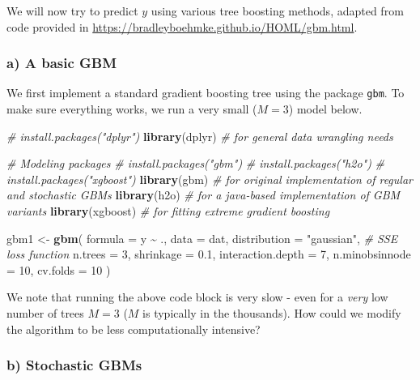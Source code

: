 \documentclass[
]{article}
\newenvironment{Shaded}{\begin{snugshade}}{\end{snugshade}}
\newcommand{\AttributeTok}[1]{\textcolor[rgb]{0.13,0.29,0.53}{#1}}
\newcommand{\CommentTok}[1]{\textcolor[rgb]{0.56,0.35,0.01}{\textit{#1}}}
\newcommand{\DecValTok}[1]{\textcolor[rgb]{0.00,0.00,0.81}{#1}}
\newcommand{\FloatTok}[1]{\textcolor[rgb]{0.00,0.00,0.81}{#1}}
\newcommand{\FunctionTok}[1]{\textcolor[rgb]{0.13,0.29,0.53}{\textbf{#1}}}
\newcommand{\NormalTok}[1]{#1}
\newcommand{\OtherTok}[1]{\textcolor[rgb]{0.56,0.35,0.01}{#1}}
\newcommand{\SpecialCharTok}[1]{\textcolor[rgb]{0.81,0.36,0.00}{\textbf{#1}}}
\newcommand{\StringTok}[1]{\textcolor[rgb]{0.31,0.60,0.02}{#1}}
\begin{document}
We will now try to predict \(y\) using various tree boosting methods,
adapted from code provided in
\url{https://bradleyboehmke.github.io/HOML/gbm.html}.

\subsubsection{a) A basic GBM}\label{a-a-basic-gbm}

We first implement a standard gradient boosting tree using the package
\texttt{gbm}. To make sure everything works, we run a very small
(\(M=3\)) model below.

\begin{Shaded}
\begin{Highlighting}[]
\CommentTok{\# install.packages("dplyr")}
\FunctionTok{library}\NormalTok{(dplyr)    }\CommentTok{\# for general data wrangling needs}

\CommentTok{\# Modeling packages}
\CommentTok{\# install.packages("gbm")}
\CommentTok{\# install.packages("h2o")}
\CommentTok{\# install.packages("xgboost")}
\FunctionTok{library}\NormalTok{(gbm)      }\CommentTok{\# for original implementation of regular and stochastic GBMs}
\FunctionTok{library}\NormalTok{(h2o)      }\CommentTok{\# for a java{-}based implementation of GBM variants}
\FunctionTok{library}\NormalTok{(xgboost)  }\CommentTok{\# for fitting extreme gradient boosting}

\NormalTok{gbm1 }\OtherTok{\textless{}{-}} \FunctionTok{gbm}\NormalTok{(}
  \AttributeTok{formula =}\NormalTok{ y }\SpecialCharTok{\textasciitilde{}}\NormalTok{ .,}
  \AttributeTok{data =}\NormalTok{ dat,}
  \AttributeTok{distribution =} \StringTok{"gaussian"}\NormalTok{,  }\CommentTok{\# SSE loss function}
  \AttributeTok{n.trees =} \DecValTok{3}\NormalTok{,}
  \AttributeTok{shrinkage =} \FloatTok{0.1}\NormalTok{,}
  \AttributeTok{interaction.depth =} \DecValTok{7}\NormalTok{,}
  \AttributeTok{n.minobsinnode =} \DecValTok{10}\NormalTok{,}
  \AttributeTok{cv.folds =} \DecValTok{10}
\NormalTok{)}
\end{Highlighting}
\end{Shaded}

We note that running the above code block is very slow - even for a
\emph{very} low number of trees \(M=3\) (\(M\) is typically in the
thousands). How could we modify the algorithm to be less computationally
intensive?

\subsubsection{b) Stochastic GBMs}\label{b-stochastic-gbms}
\end{document}

